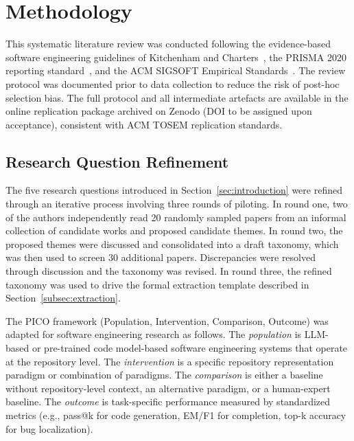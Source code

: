 \section{Methodology}
\label{sec:methodology}

This systematic literature review was conducted following the evidence-based software
engineering guidelines of Kitchenham and Charters~\cite{kitchenham2007guidelines}, the
PRISMA 2020 reporting standard~\cite{page2021prisma}, and the ACM SIGSOFT Empirical
Standards~\cite{acm2020empirical}. The review protocol was documented prior to data
collection to reduce the risk of post-hoc selection bias. The full protocol and all
intermediate artefacts are available in the online replication package archived on Zenodo
(DOI to be assigned upon acceptance), consistent with ACM TOSEM replication standards.

\subsection{Research Question Refinement}
\label{subsec:rq-refinement}

The five research questions introduced in Section~\ref{sec:introduction} were refined through
an iterative process involving three rounds of piloting. In round one, two of the authors
independently read 20 randomly sampled papers from an informal collection of candidate works
and proposed candidate themes. In round two, the proposed themes were discussed and consolidated
into a draft taxonomy, which was then used to screen 30 additional papers. Discrepancies were
resolved through discussion and the taxonomy was revised. In round three, the refined taxonomy
was used to drive the formal extraction template described in Section~\ref{subsec:extraction}.

The PICO framework (Population, Intervention, Comparison, Outcome) was adapted for software
engineering research as follows. The \emph{population} is LLM-based or pre-trained code
model-based software engineering systems that operate at the repository level. The
\emph{intervention} is a specific repository representation paradigm or combination of
paradigms. The \emph{comparison} is either a baseline without repository-level context, an
alternative paradigm, or a human-expert baseline. The \emph{outcome} is task-specific
performance measured by standardized metrics (e.g., pass@k for code generation, EM/F1 for
completion, top-k accuracy for bug localization).

